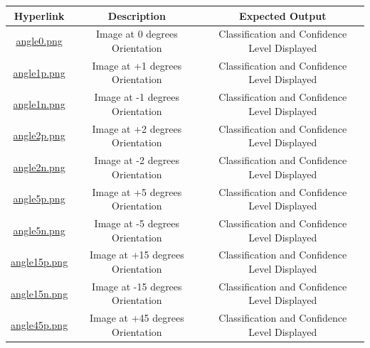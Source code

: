 \documentclass[12pt, titlepage]{article}
\begin{document}
\begin{landscape}
  \begin{table}[h!]
    \centering
    \begin{tabular}{|c|c|c|}
      \hline
      \textbf{Hyperlink} & \textbf{Description} & \textbf{Expected Output} \\ \hline
      \href{https://github.com/cer-hunter/OAR-CAS741/tree/main/tests/test-images/angle0.png}{angle0.png} & Image at 0 degrees Orientation & Classification and Confidence Level Displayed\\ \hline
      \href{https://github.com/cer-hunter/OAR-CAS741/tree/main/tests/test-images/angle1p.png}{angle1p.png} & Image at +1 degrees Orientation & Classification and Confidence Level Displayed\\ \hline
      \href{https://github.com/cer-hunter/OAR-CAS741/tree/main/tests/test-images/angle1n.png}{angle1n.png} & Image at -1 degrees Orientation & Classification and Confidence Level Displayed\\ \hline
      \href{https://github.com/cer-hunter/OAR-CAS741/tree/main/tests/test-images/angle2p.png}{angle2p.png} & Image at +2 degrees Orientation & Classification and Confidence Level Displayed\\ \hline
      \href{https://github.com/cer-hunter/OAR-CAS741/tree/main/tests/test-images/angle2n.png}{angle2n.png} & Image at -2 degrees Orientation & Classification and Confidence Level Displayed\\ \hline
      \href{https://github.com/cer-hunter/OAR-CAS741/tree/main/tests/test-images/angle5p.png}{angle5p.png} & Image at +5 degrees Orientation & Classification and Confidence Level Displayed\\ \hline
      \href{https://github.com/cer-hunter/OAR-CAS741/tree/main/tests/test-images/angle5n.png}{angle5n.png} & Image at -5 degrees Orientation & Classification and Confidence Level Displayed\\ \hline
      \href{https://github.com/cer-hunter/OAR-CAS741/tree/main/tests/test-images/angle15p.png}{angle15p.png} & Image at +15 degrees Orientation & Classification and Confidence Level Displayed\\ \hline
      \href{https://github.com/cer-hunter/OAR-CAS741/tree/main/tests/test-images/angle15n.png}{angle15n.png} & Image at -15 degrees Orientation & Classification and Confidence Level Displayed\\ \hline
      \href{https://github.com/cer-hunter/OAR-CAS741/tree/main/tests/test-images/angle45p.png}{angle45p.png} & Image at +45 degrees Orientation & Classification and Confidence Level Displayed\\ \hline

\end{tabular}
\end{table}
\end{landscape}
\end{document}
